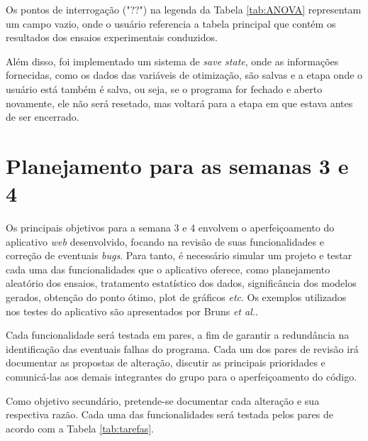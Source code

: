 \documentclass[12pt]{article}
\begin{document}
Os pontos de interrogação ("??") na legenda da Tabela \ref{tab:ANOVA} representam um campo vazio, onde o usuário referencia a tabela principal que contém os resultados dos ensaios experimentais conduzidos.

\newline

Além disso, foi implementado um sistema de \textit{save state}, onde as informações fornecidas, como os dados das variáveis de otimização, são salvas e
a etapa onde o usuário está também é salva, ou seja, se o programa for fechado e aberto novamente, ele não será resetado,
mas voltará para a etapa em que estava antes de ser encerrado.

\newpage

\section{Planejamento para as semanas 3 e 4}

Os principais objetivos para a semana 3 e 4 envolvem o aperfeiçoamento do aplicativo \textit{web} desenvolvido, focando na revisão de suas funcionalidades e correção de eventuais \textit{bugs}. Para tanto, é necessário simular um projeto e testar cada uma das funcionalidades que o aplicativo oferece, como planejamento aleatório dos ensaios, tratamento estatístico dos dados, significância dos modelos gerados, obtenção do ponto ótimo, plot de gráficos \textit{etc}. Os exemplos utilizados nos testes do aplicativo são apresentados por Bruns \textit{et al.}\cite{barrosneto2001}.

Cada funcionalidade será testada em pares, a fim de garantir a redundância na identificação das eventuais falhas do programa. Cada um dos pares de revisão irá documentar as propostas de alteração, discutir as principais prioridades e comunicá-las aos demais integrantes do grupo para o aperfeiçoamento do código.

Como objetivo secundário, pretende-se documentar cada alteração e sua respectiva razão. Cada uma das funcionalidades será testada pelos pares de acordo com a Tabela \ref{tab:tarefas}.
\end{document}
